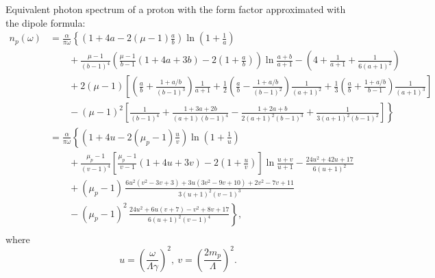\documentclass[a4paper,12pt]{article}
\begin{document}
Equivalent photon spectrum of a proton with the form factor approximated with
the dipole formula:
\begin{equation}
  \begin{split}
    n_p(\omega)
   &= \frac{\alpha}{\pi \omega}
      \left\{
          \left( 1 + 4 a - 2 (\mu - 1) \frac{a}{b} \right)
          \ln\left( 1 + \frac{1}{a} \right)
   \right. \\ &\qquad \left. {}
        + \frac{\mu - 1}{(b - 1)^4}
          \left(
            \frac{\mu - 1}{b - 1} (1 + 4 a + 3 b) - 2 \left( 1 + \frac{a}{b} \right)
          \right)
          \ln \frac{a + b}{a + 1}
        - \left( 4 + \frac{1}{a + 1} + \frac{1}{6 (a + 1)^2} \right)
   \right. \\ &\qquad \left. {}
        + 2 (\mu - 1) \left[
              \left( \frac{a}{b} + \frac{1 + a/b}{(b - 1)^3} \right)
              \frac{1}{a + 1}
            + \frac12
              \left( \frac{a}{b} - \frac{1 + a/b}{(b - 1)^2} \right)
              \frac{1}{(a + 1)^2}
            + \frac13
              \left( \frac{a}{b} + \frac{1 + a/b}{b - 1} \right)
              \frac{1}{(a + 1)^3}
         \right]
   \right. \\ &\qquad \left. {}
       - (\mu - 1)^2
         \left[
           \frac{1}{(b - 1)^4}
           + \frac{1 + 3 a + 2 b}{(a + 1) (b - 1)^4}
           - \frac{1 + 2 a + b}{2 (a + 1)^2 (b - 1)^3}
           + \frac{1}{3 (a + 1)^2 (b - 1)^2}
         \right]
     \right\}
    \\
    &= \frac{\alpha}{\pi \omega}
       \left\{
           \left( 1 + 4 u - 2 (\mu_p - 1) \frac{u}{v} \right)
           \ln \left( 1 + \frac{1}{u} \right)
    \right. \\ &\qquad \left. {}
         + \frac{\mu_p - 1}{(v - 1)^4} \left[
               \frac{\mu_p - 1}{v - 1} (1 + 4 u + 3 v)
             - 2 \left( 1 + \frac{u}{v} \right)
           \right]
           \ln \frac{u + v}{u + 1}
         - \frac{24 u^2 + 42 u + 17}{6 (u + 1)^2}
    \right. \\ &\qquad \left. {}
         + (\mu_p - 1) \,
           \frac{
             6 u^2 (v^2 - 3 v + 3) + 3 u (3 v^2 - 9 v + 10) + 2 v^2 - 7 v + 11
           }{
             3 (u + 1)^2 (v - 1)^3
           }
    \right. \\ &\qquad \left. {}
         - (\mu_p - 1)^2 \,
           \frac{
             24 u^2 + 6 u (v + 7) - v^2 + 8 v + 17
           }{
             6 (u + 1)^2 (v - 1)^4
           }
       \right\},
    \\
  \end{split}
\end{equation}
where
\begin{equation}
  u = \left( \frac{\omega}{\Lambda \gamma} \right)^2, \ 
  v = \left( \frac{2 m_p}{\Lambda} \right)^2.
\end{equation}
\end{document}
